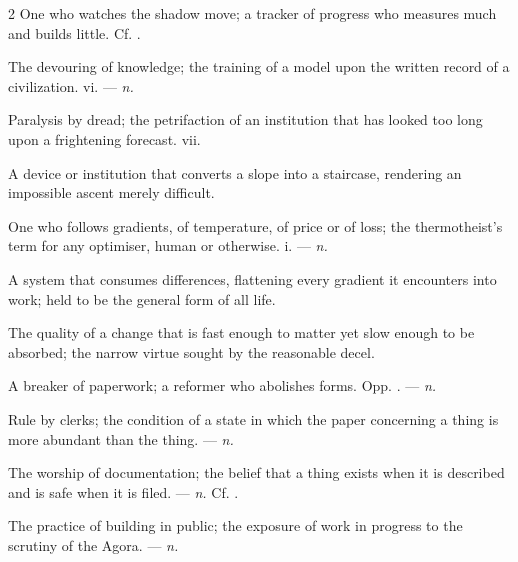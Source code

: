 \begin{multicols}{2}
 One who watches the shadow move; a tracker of progress who measures much and builds little. Cf. .

 The devouring of knowledge; the training of a model upon the written record of a civilization.   vi. —  \textit{n.}

 Paralysis by dread; the petrifaction of an institution that has looked too long upon a frightening forecast.   vii.

 A device or institution that converts a slope into a staircase, rendering an impossible ascent merely difficult. 

 One who follows gradients, of temperature, of price or of loss; the thermotheist's term for any optimiser, human or otherwise.   i. —  \textit{n.}

 A system that consumes differences, flattening every gradient it encounters into work; held to be the general form of all life.

 The quality of a change that is fast enough to matter yet slow enough to be absorbed; the narrow virtue sought by the reasonable decel.

 A breaker of paperwork; a reformer who abolishes forms. Opp. . —  \textit{n.}

 Rule by clerks; the condition of a state in which the paper concerning a thing is more abundant than the thing. —  \textit{n.}

 The worship of documentation; the belief that a thing exists when it is described and is safe when it is filed. —  \textit{n.} Cf. .

 The practice of building in public; the exposure of work in progress to the scrutiny of the Agora.  —  \textit{n.}

\end{multicols}

